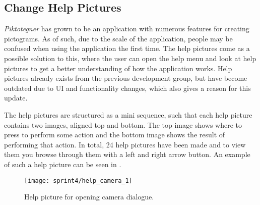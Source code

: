 \subsection*{Change Help Pictures}
\textit{Piktotegner} has grown to be an application with numerous features for creating pictograms.
As of such, due to the scale of the application, people may be confused when using the application the first time.
The help pictures come as a possible solution to this, where the user can open the help menu and look at help pictures to get a better understanding of how the application works.
Help pictures already exists from the previous development group, but have become outdated due to UI and functionality changes, which also gives a reason for this update. 

The help pictures are structured as a mini sequence, such that each help picture contains two images, aligned top and bottom.
The top image shows where to press to perform some action and the bottom image shows the result of performing that action.
In total, 24 help pictures have been made and to view them you browse through them with a left and right arrow button.
An example of such a help picture can be seen in .

\begin{figure}[h]
     \centering
     \texttt{[image: sprint4/help\_camera\_1]}
     \caption{Help picture for opening camera dialogue.}
     \label{fig:helpCamera}
\end{figure}


